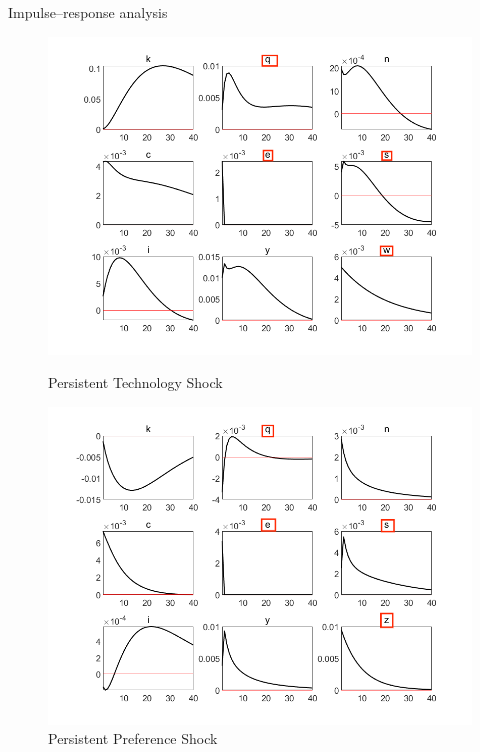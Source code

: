 \documentclass[fontset=windows,12pt,t,aspectratio=169]{beamer}
\begin{document}
\begin{frame}{Impulse–response analysis}
    \begin{multicols}{2}
		\begin{figure}
			\includegraphics[scale=0.22]{table/s_fig_tec.png}
            \caption*{Persistent Technology Shock}
			\includegraphics[scale=0.22]{table/s_fig_pre.png}
            \caption*{Persistent Preference Shock}
		\end{figure}
	\end{multicols}

\end{frame}
\end{document}
